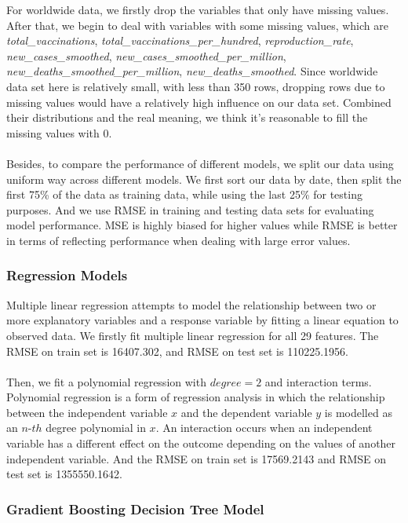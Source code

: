 \documentclass{article}
\begin{document}
For worldwide data, we firstly drop the variables that only have missing values. After that, we begin to deal with variables with some missing values, which are \textit{total\_vaccinations}, \textit{total\_vaccinations\_per\_hundred}, \textit{reproduction\_rate}, \textit{new\_cases\_smoothed}, \textit{new\_cases\_smoothed\_per\_million}, \textit{new\_deaths\_smoothed\_per\_million}, \textit{new\_deaths\_smoothed}. Since worldwide data set here is relatively small, with less than 350 rows, dropping rows due to missing values would have a relatively high influence on our data set. Combined their distributions and the real meaning, we think it's reasonable to fill the missing values with 0.\\
\\
Besides, to compare the performance of different models, we split our data using uniform way across different models. We first sort our data by date, then split the first 75\% of the data as training data, while using the last 25\% for testing purposes. And we use RMSE in training and testing data sets for evaluating model performance. MSE is highly biased for higher values while RMSE is better in terms of reflecting performance when dealing with large error values. 


\subsubsection{Regression Models}

Multiple linear regression attempts to model the relationship between two or more explanatory variables and a response variable by fitting a linear equation to observed data. We firstly fit multiple linear regression for all 29 features. The RMSE on train set is 16407.302, and RMSE on test set is 110225.1956. \\
\\
Then, we fit a polynomial regression with $degree = 2$ and interaction terms. Polynomial regression is a form of regression analysis in which the relationship between the independent variable $x$ and the dependent variable $y$ is modelled as an $n$-$th$ degree polynomial in $x$. An interaction occurs when an independent variable has a different effect on the outcome depending on the values of another independent variable. And the RMSE on train set is  17569.2143 and RMSE on test set is  1355550.1642.

\subsubsection{Gradient Boosting Decision Tree Model}
\end{document}
